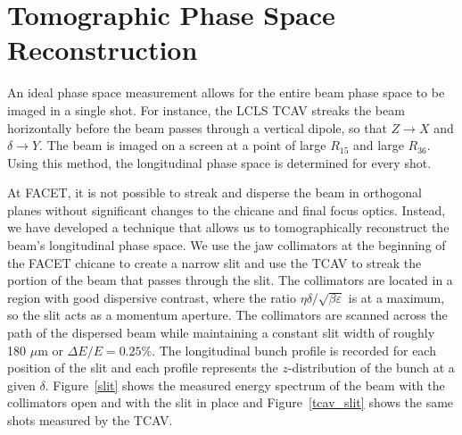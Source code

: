 \documentclass[%
twocolumn,
showpacs,preprintnumbers,
 aps,
prstab,
]{revtex4-1}
\begin{document}
\section{Tomographic Phase Space Reconstruction}\label{sec:tomo}
An ideal phase space measurement allows for the entire beam phase space to be imaged in a single shot. For instance, the LCLS TCAV streaks the beam horizontally before the beam passes through a vertical dipole, so that $Z\rightarrow X$ and $\delta \rightarrow Y$. The beam is imaged on a screen at a point of large $R_{15}$ and large $R_{36}$. Using this method, the longitudinal phase space is determined for every shot. 


At FACET, it is not possible to streak and disperse the beam in orthogonal planes without significant changes to the chicane and final focus optics. Instead, we have developed a technique that allows us to tomographically reconstruct the beam's longitudinal phase space.  We use the jaw collimators at the beginning of the FACET chicane to create a narrow slit and use the TCAV to streak the portion of the beam that passes through the slit. The collimators are located in a region with good dispersive contrast, where the ratio $\eta \delta / \sqrt{\beta \varepsilon}$ is at a maximum, so the slit acts as a momentum aperture. The collimators are scanned across the path of the dispersed beam while maintaining a constant slit width of roughly 180 $\mu$m or $\Delta E/E = 0.25\%$. The longitudinal bunch profile is recorded for each position of the slit and each profile represents the $z$-distribution of the bunch at a given $\delta$. Figure~\ref{slit} shows the measured energy spectrum of the beam with the collimators open and with the slit in place and Figure~\ref{tcav_slit} shows the same shots measured by the TCAV.
\end{document}
